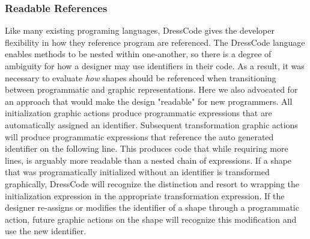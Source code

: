 \documentclass{sigchi}
\begin{document}
\subsubsection{Readable References}
Like many existing programing languages, DressCode gives the developer flexibility in how they reference program are referenced. The DressCode language enables methods to be nested within one-another, so there is a degree of ambiguity for how a designer may use identifiers in their code. As a result, it was necessary to evaluate \textit{how} shapes should be referenced when transitioning between programmatic and graphic representations. Here we also advocated for an approach that would make the design "readable" for new programmers. All initialization graphic actions produce programmatic expressions that are automatically assigned an identifier. Subsequent transformation graphic actions will produce programmatic expressions that reference the auto generated identifier on the following line. This produces code that while requiring more lines, is arguably more readable than a nested chain of expressions. If a shape that was programatically initialized without an identifier is transformed graphically, DressCode will recognize the distinction and resort to wrapping the initialization expression in the appropriate transformation expression. If the designer re-assigns or modifies the identifier of a shape through a programmatic action, future graphic actions on the shape will recognize this modification and use the new identifier.   
\end{document}
